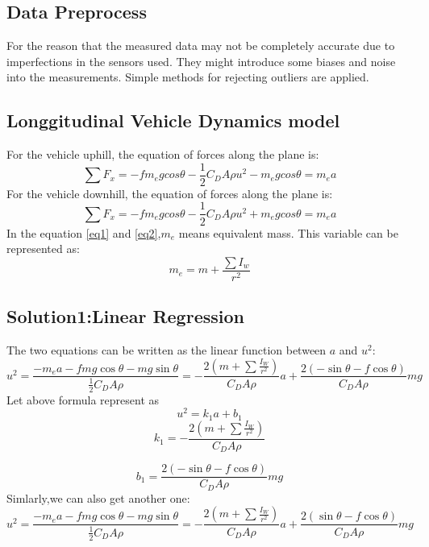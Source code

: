 \documentclass[UTF8,a4paper,11pt]{article}
\begin{document}
\subsection{Data Preprocess}
For the reason that the measured data may not be completely accurate due to imperfections in the sensors used. They might introduce some biases and noise into the measurements. Simple methods for rejecting outliers are applied.

\subsection{Longgitudinal Vehicle Dynamics model}
For the vehicle uphill, the equation of forces along the plane is:
\begin{equation}\label{eq1}
\sum F_x = -fm_egcos\theta-\frac{1}{2}C_DA\rho u^2-m_egcos\theta = m_ea
\end{equation}
For the vehicle downhill, the equation of forces along the plane is:
\begin{equation}\label{eq2}
\sum F_x = -fm_egcos\theta-\frac{1}{2}C_DA\rho u^2+m_egcos\theta = m_ea
\end{equation}
In the equation \ref{eq1} and \ref{eq2},$m_e$ means equivalent mass. This variable can be represented as:
$$m_e = m + \frac{\sum I_w}{r^2}$$

\subsection{Solution1:Linear Regression}
The two equations can be written as the linear function between $a$ and $u^2$:
$$
u^{2}=\frac{-m_{e} a-f m g \cos \theta-m g \sin \theta}{\frac{1}{2} C_{D} A \rho}=-\frac{2\left(m+\sum \frac{I_{W}}{r^{2}}\right)}{C_{D} A \rho} a+\frac{2(-\sin \theta-f \cos \theta)}{C_{D} A \rho} m g
$$
Let above formula represent as $$u^2=k_{1} a+b_{1}$$
$$
k_1 = -\frac{2\left(m+\sum \frac{I_{W}}{r^{2}}\right)}{C_{D} A \rho}
$$

$$
b_1 = \frac{2(-\sin \theta-f \cos \theta)}{C_{D} A \rho} m g
$$
Simlarly,we can also get another one:
$$
u^{2}=\frac{-m_{e} a-f m g \cos \theta-m g \sin \theta}{\frac{1}{2} C_{D} A \rho}=-\frac{2\left(m+\sum \frac{I_{W}}{r^{2}}\right)}{C_{D} A \rho} a+\frac{2(\sin \theta-f \cos \theta)}{C_{D} A \rho} m g
$$
\end{document}
